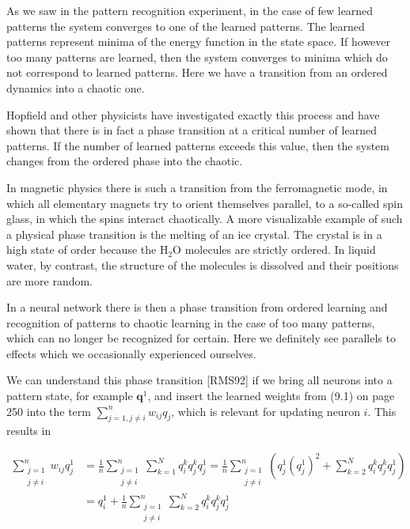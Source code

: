 \documentclass[10pt]{article}
\begin{document}
As we saw in the pattern recognition experiment, in the case of few learned patterns the system converges to one of the learned patterns. The learned patterns represent minima of the energy function in the state space. If however too many patterns are learned, then the system converges to minima which do not correspond to learned patterns. Here we have a transition from an ordered dynamics into a chaotic one.

Hopfield and other physicists have investigated exactly this process and have shown that there is in fact a phase transition at a critical number of learned patterns. If the number of learned patterns exceeds this value, then the system changes from the ordered phase into the chaotic.

In magnetic physics there is such a transition from the ferromagnetic mode, in which all elementary magnets try to orient themselves parallel, to a so-called spin glass, in which the spins interact chaotically. A more visualizable example of such a physical phase transition is the melting of an ice crystal. The crystal is in a high state of order because the $\mathrm{H}_{2} \mathrm{O}$ molecules are strictly ordered. In liquid water, by contrast, the structure of the molecules is dissolved and their positions are more random.

In a neural network there is then a phase transition from ordered learning and recognition of patterns to chaotic learning in the case of too many patterns, which can no longer be recognized for certain. Here we definitely see parallels to effects which we occasionally experienced ourselves.

We can understand this phase transition [RMS92] if we bring all neurons into a pattern state, for example $\boldsymbol{q}^{1}$, and insert the learned weights from (9.1) on page 250 into the term $\sum_{j=1, j \neq i}^{n} w_{i j} q_{j}$, which is relevant for updating neuron $i$. This results in

$$
\begin{aligned}
\sum_{\substack{j=1 \\
j \neq i}}^{n} w_{i j} q_{j}^{1} & =\frac{1}{n} \sum_{\substack{j=1 \\
j \neq i}}^{n} \sum_{k=1}^{N} q_{i}^{k} q_{j}^{k} q_{j}^{1}=\frac{1}{n} \sum_{\substack{j=1 \\
j \neq i}}^{n}\left(q_{j}^{1}\left(q_{j}^{1}\right)^{2}+\sum_{k=2}^{N} q_{i}^{k} q_{j}^{k} q_{j}^{1}\right) \\
& =q_{i}^{1}+\frac{1}{n} \sum_{\substack{j=1 \\
j \neq i}}^{n} \sum_{k=2}^{N} q_{i}^{k} q_{j}^{k} q_{j}^{1}
\end{aligned}
$$
\end{document}
